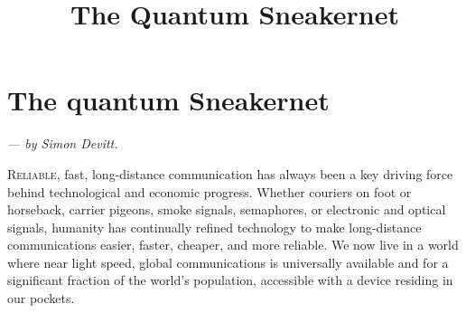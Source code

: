 \documentclass[twocolumn, aps, rmp, amsmath, amssymb, nofootinbib, superscriptaddress, longbibliography, floatfix, table-of-contents, eqsecnum]{revtex4-2}
\newcommand{\sectionby}[1]{\begin{center}\textit{--- by #1.}\end{center}}
\newcommand{\dropcap}[2]{\lettrine[lines=2, findent=3pt, nindent=0pt]{#1}{#2}}
\begin{document}
\title{The Quantum Sneakernet}

\maketitle

\tableofcontents 

\section{The quantum Sneakernet\texttrademark}\label{sec:sneakernet}

\sectionby{Simon Devitt}

\dropcap{R}{eliable}, fast, long-distance communication has always been a key driving force behind technological and economic progress. Whether couriers on foot or horseback, carrier pigeons, smoke signals, semaphores, or electronic and optical signals, humanity has continually refined technology to make long-distance communications easier, faster, cheaper, and more reliable. We now live in a world where near light speed, global communications is universally available and for a significant fraction of the world's population, accessible with a device residing in our pockets. 
\end{document}
